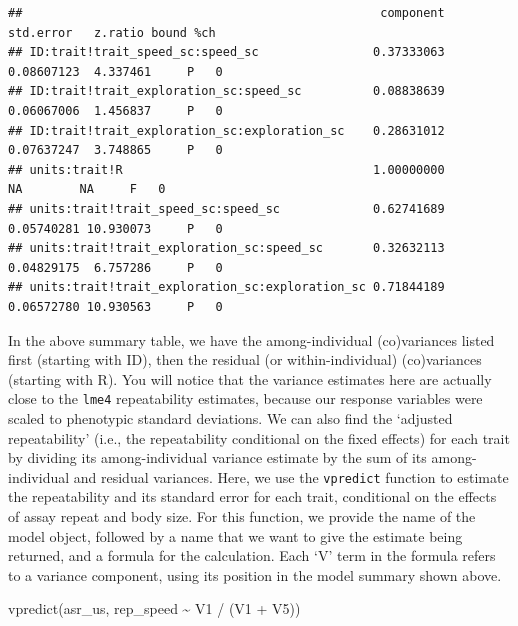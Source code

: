 \documentclass[
  12pt,
]{book}
\newenvironment{Shaded}{\begin{snugshade}}{\end{snugshade}}
\newcommand{\FunctionTok}[1]{\textcolor[rgb]{0.00,0.00,0.00}{#1}}
\newcommand{\NormalTok}[1]{#1}
\newcommand{\SpecialCharTok}[1]{\textcolor[rgb]{0.00,0.00,0.00}{#1}}
\begin{document}
\begin{Shaded}
\end{Shaded}

\begin{verbatim}
##                                                  component  std.error   z.ratio bound %ch
## ID:trait!trait_speed_sc:speed_sc                0.37333063 0.08607123  4.337461     P   0
## ID:trait!trait_exploration_sc:speed_sc          0.08838639 0.06067006  1.456837     P   0
## ID:trait!trait_exploration_sc:exploration_sc    0.28631012 0.07637247  3.748865     P   0
## units:trait!R                                   1.00000000         NA        NA     F   0
## units:trait!trait_speed_sc:speed_sc             0.62741689 0.05740281 10.930073     P   0
## units:trait!trait_exploration_sc:speed_sc       0.32632113 0.04829175  6.757286     P   0
## units:trait!trait_exploration_sc:exploration_sc 0.71844189 0.06572780 10.930563     P   0
\end{verbatim}

In the above summary table, we have the among-individual (co)variances listed first (starting with ID), then the residual (or within-individual) (co)variances (starting with R). You will notice that the variance estimates here are actually close to the \texttt{lme4} repeatability estimates, because our response variables were scaled to phenotypic standard deviations. We can also find the `adjusted repeatability' (i.e., the repeatability conditional on the fixed effects) for each trait by dividing its among-individual variance estimate by the sum
of its among-individual and residual variances.
Here, we use the \texttt{vpredict} function to estimate the repeatability and its
standard error for each trait, conditional on the effects of assay repeat and body size.
For this function, we provide the name of the model object, followed by a name that we want to give the estimate being returned, and a formula for the calculation. Each `V' term in the formula refers to a variance component, using its position in the model summary shown above.

\begin{Shaded}
\begin{Highlighting}[]
\FunctionTok{vpredict}\NormalTok{(asr\_us, rep\_speed }\SpecialCharTok{\textasciitilde{}}\NormalTok{ V1 }\SpecialCharTok{/}\NormalTok{ (V1 }\SpecialCharTok{+}\NormalTok{ V5))}
\end{Highlighting}
\end{Shaded}
\end{document}
